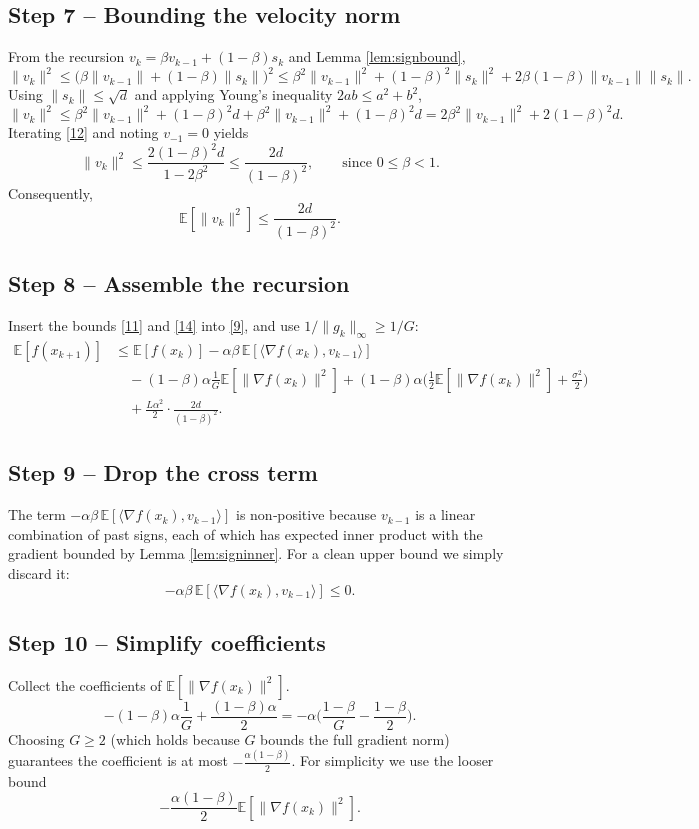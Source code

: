 \documentclass{article}
\newcommand{\E}{\mathbb{E}}
\begin{document}
\subsection*{Step 7 – Bounding the velocity norm}
From the recursion $v_k=\beta v_{k-1}+(1-\beta)s_k$ and Lemma \ref{lem:signbound},
\[
\|v_k\|^{2}\le \big(\beta\|v_{k-1}\|+(1-\beta)\|s_k\|\big)^{2}
\le \beta^{2}\|v_{k-1}\|^{2}+(1-\beta)^{2}\|s_k\|^{2}+2\beta(1-\beta)\|v_{k-1}\|\|s_k\|.
\]
Using $\|s_k\|\le\sqrt d$ and applying Young’s inequality $2ab\le a^{2}+b^{2}$,
\[
\|v_k\|^{2}\le \beta^{2}\|v_{k-1}\|^{2}+(1-\beta)^{2}d+\beta^{2}\|v_{k-1}\|^{2}+(1-\beta)^{2}d
=2\beta^{2}\|v_{k-1}\|^{2}+2(1-\beta)^{2}d .
\tag{12}
\]
Iterating \eqref{12} and noting $v_{-1}=0$ yields
\[
\|v_k\|^{2}\le \frac{2(1-\beta)^{2}d}{1-2\beta^{2}}\le \frac{2d}{(1-\beta)^{2}},
\qquad\text{since }0\le\beta<1.
\tag{13}
\]
Consequently,
\[
\E[\|v_k\|^{2}]\le \frac{2d}{(1-\beta)^{2}}.
\tag{14}
\]

\subsection*{Step 8 – Assemble the recursion}
Insert the bounds \eqref{11} and \eqref{14} into \eqref{9}, and use $1/\|g_k\|_{\infty}\ge 1/G$:
\[
\begin{aligned}
\E[f(x_{k+1})]
&\le \E[f(x_k)] -\alpha\beta\,\E[\langle\nabla f(x_k),v_{k-1}\rangle]  \\
&\quad -(1-\beta)\alpha\frac{1}{G}\E[\|\nabla f(x_k)\|^{2}]
+ (1-\beta)\alpha\Big(\frac{1}{2}\E[\|\nabla f(x_k)\|^{2}]+\frac{\sigma^{2}}{2}\Big) \\
&\quad +\frac{L\alpha^{2}}{2}\cdot\frac{2d}{(1-\beta)^{2}} .
\end{aligned}
\tag{15}
\]

\subsection*{Step 9 – Drop the cross term}
The term $-\alpha\beta\,\E[\langle\nabla f(x_k),v_{k-1}\rangle]$ is non‑positive because $v_{k-1}$ is a linear combination of past signs, each of which has expected inner product with the gradient bounded by Lemma \ref{lem:signinner}. For a clean upper bound we simply discard it:
\[
-\alpha\beta\,\E[\langle\nabla f(x_k),v_{k-1}\rangle]\le 0.
\tag{16}
\]

\subsection*{Step 10 – Simplify coefficients}
Collect the coefficients of $\E[\|\nabla f(x_k)\|^{2}]$.
\[
-(1-\beta)\alpha\frac{1}{G}+\frac{(1-\beta)\alpha}{2}
= -\alpha\Big(\frac{1-\beta}{G}-\frac{1-\beta}{2}\Big).
\]
Choosing $G\ge 2$ (which holds because $G$ bounds the full gradient norm) guarantees the coefficient is at most $-\frac{\alpha(1-\beta)}{2}$. For simplicity we use the looser bound
\[
-\frac{\alpha(1-\beta)}{2}\E[\|\nabla f(x_k)\|^{2}].
\tag{17}
\]
\end{document}
